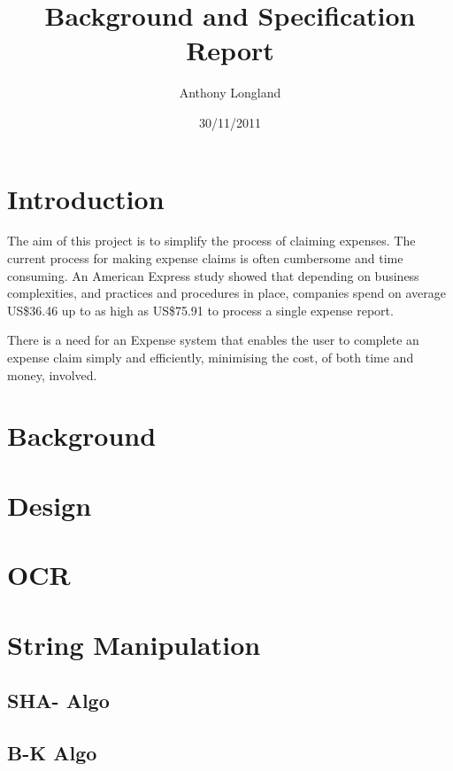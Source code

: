\documentclass[a4paper]{article}
\begin{document}
\title{Background and Specification Report}
\author{Anthony Longland}
\date{30/11/2011} %
\maketitle

\tableofcontents


\section{Introduction}
The aim of this project is to simplify the process of claiming expenses. The current process for making expense claims is often cumbersome and time consuming. 
An American Express study showed that depending on business complexities, and practices and procedures in place, companies spend on average US\$36.46 up to as high as US\$75.91 to process a single expense report.\cite{Expense2010}

There is a need for an Expense system that enables the user to complete an expense claim simply and efficiently, minimising the cost, of both time and money, involved.


\section{Background}

\section{Design}

\section{OCR}

\section{String Manipulation}

\subsection{SHA- Algo}

\subsection{B-K Algo}
\end{document}
